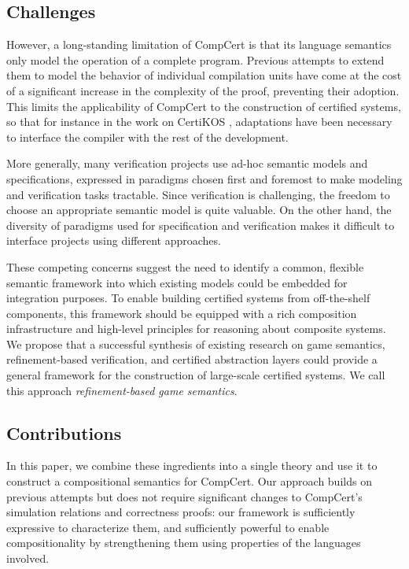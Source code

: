 \documentclass[sigplan,10pt,review,anonymous]{acmart}
\begin{document}

\subsection{Challenges} %

However,
a long-standing limitation of CompCert is that
its language semantics
only model the operation of a complete program.
Previous attempts to extend them
to model the behavior of individual compilation units
\cite{compcompcert,cpp15}
have come at the cost of a significant increase
in the complexity of the proof,
preventing their adoption.
This limits the applicability of CompCert
to the construction of certified systems,
so that for instance in the work on CertiKOS \cite{popl15,osdi16,ccal},
adaptations have been necessary
to interface the compiler with the rest of the development.

More generally, many verification projects
use ad-hoc semantic models and specifications,
expressed in paradigms chosen first and foremost
to make modeling and verification tasks tractable.
Since verification is challenging,
the freedom to choose an appropriate semantic model
is quite valuable.
On the other hand,
the diversity of paradigms used for specification and verification
makes it difficult
to interface projects using different approaches.

These competing concerns
suggest the need to identify a common,
flexible semantic framework
into which existing models could be embedded
for integration purposes.
To enable building certified systems
from off-the-shelf components,
this framework should be equipped with
a rich composition infrastructure
and high-level principles for
reasoning about composite systems.
We propose that
a successful synthesis of existing research
on game semantics,
refinement-based verification,
and certified abstraction layers
could provide a general framework
for the construction of large-scale certified systems.
We call this approach \emph{refinement-based game semantics}.


\subsection{Contributions} %

In this paper,
we combine these ingredients into a single theory
and use it to construct a
compositional semantics for CompCert.
Our approach builds on previous attempts
but does not require significant changes
to CompCert's simulation relations and correctness proofs:
our framework is sufficiently expressive to
characterize them, and
sufficiently powerful to enable compositionality
by strengthening them
using properties of the languages involved.
\end{document}
